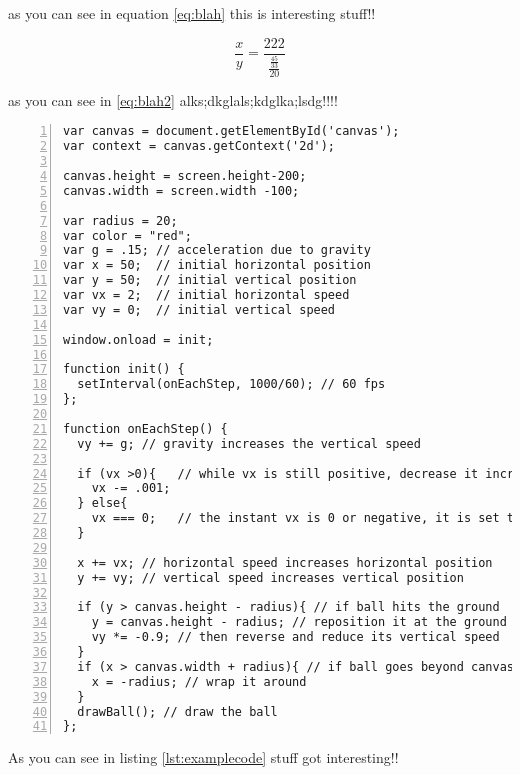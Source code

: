 as you can see in equation \ref{eq:blah} this is interesting stuff!!


\begin{equation} \label{eq:blah2}
\frac{x}{y} = \frac{222}{\frac{\frac{45}{33}}{20}}
\end{equation}

as you can see in  \ref{eq:blah2}  alks;dkglals;kdglka;lsdg!!!!


\begin{lstlisting}[breaklines=true, frame=single, numbers=left, caption=Some Code, label=lst:examplecode]
var canvas = document.getElementById('canvas');
var context = canvas.getContext('2d'); 

canvas.height = screen.height-200;
canvas.width = screen.width -100;

var radius = 20;
var color = "red";
var g = .15; // acceleration due to gravity
var x = 50;  // initial horizontal position
var y = 50;  // initial vertical position
var vx = 2;  // initial horizontal speed
var vy = 0;  // initial vertical speed
 
window.onload = init; 

function init() {
  setInterval(onEachStep, 1000/60); // 60 fps
};
 
function onEachStep() {
  vy += g; // gravity increases the vertical speed

  if (vx >0){   // while vx is still positive, decrease it incrementally to represent air resistance/friction
    vx -= .001;
  } else{
    vx === 0;   // the instant vx is 0 or negative, it is set to 0 to stop the movement in x direction
  }

  x += vx; // horizontal speed increases horizontal position 
  y += vy; // vertical speed increases vertical position
 
  if (y > canvas.height - radius){ // if ball hits the ground
    y = canvas.height - radius; // reposition it at the ground
    vy *= -0.9; // then reverse and reduce its vertical speed
  }
  if (x > canvas.width + radius){ // if ball goes beyond canvas
    x = -radius; // wrap it around 
  }
  drawBall(); // draw the ball
};
\end{lstlisting}
As you can see in listing \ref{lst:examplecode}  stuff got interesting!!  \cite{lamport94}























